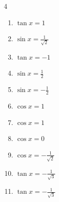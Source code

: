 \begin{multicols}{4}
\begin{enumerate}

  \item $\displaystyle \tan{x}  = 1$


\columnbreak %

  \item $\displaystyle \sin{x}  = \frac{1}{\sqrt{2}}$


  \item $\displaystyle \tan{x}  = -1$


  \item $\displaystyle \sin{x}  = \frac{1}{2}$


  \item $\displaystyle \sin{x}  = -\frac{1}{2}$


  \item $\displaystyle \cos{x}  = 1$


  \item $\displaystyle \cos{x}  = 1$


  \item $\displaystyle \cos{x}  = 0$


  \item $\displaystyle \cos{x}  = -\frac{1}{\sqrt{2}}$


  \item $\displaystyle \tan{x}  = -\frac{1}{\sqrt{3}}$


  \item $\displaystyle \tan{x}  = -\frac{1}{\sqrt{3}}$



\end{enumerate}
\end{multicols}
